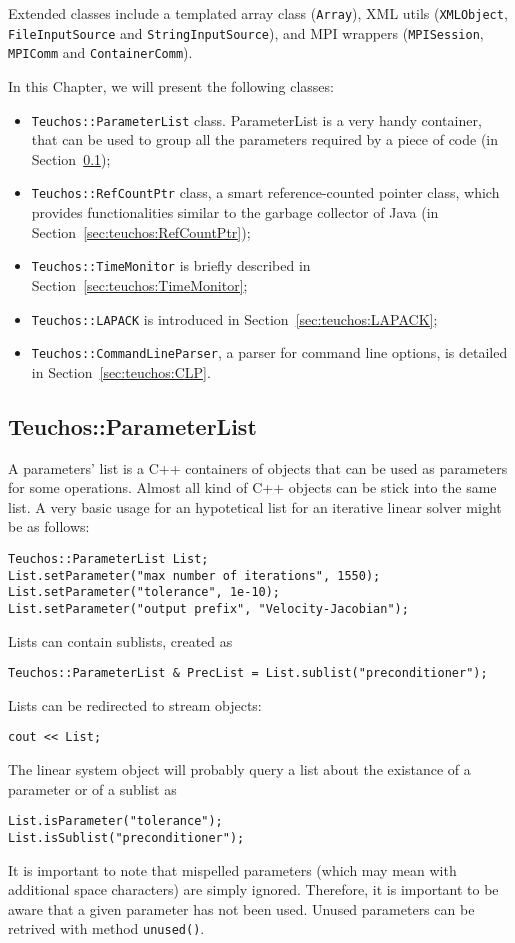 Extended classes include a templated array class
(\verb!Array!), XML utils ({\tt XMLObject},
{\tt FileInputSource} and {\tt StringInputSource}),
and MPI wrappers (\verb!MPISession!, \verb!MPIComm!
and \verb!ContainerComm!).

\medskip

In this Chapter, we will present the following classes:
\begin{itemize}
\item \verb!Teuchos::ParameterList! class. ParameterList is a very handy
  container, that can be used to group all the parameters required by a
  piece of code (in Section~\ref{sec:teuchos:ParameterList});
\item \verb!Teuchos::RefCountPtr! class, a smart reference-counted
  pointer class, which provides functionalities similar to the garbage
  collector of Java (in Section~\ref{sec:teuchos:RefCountPtr});
\item \verb!Teuchos::TimeMonitor! is briefly described in
  Section~\ref{sec:teuchos:TimeMonitor};
\item \verb!Teuchos::LAPACK! is introduced in
  Section~\ref{sec:teuchos:LAPACK};
\item \verb!Teuchos::CommandLineParser!, a parser for command line
  options, is detailed in Section~\ref{sec:teuchos:CLP}.
\end{itemize}


\subsection{Teuchos::ParameterList}
\label{sec:teuchos:ParameterList}

A parameters' list is a C++ containers of objects that can be used as
parameters for some operations. Almost all kind of C++ objects can be
stick into the same list. A very basic usage for an hypotetical list for
an iterative linear solver might be as follows:
\begin{verbatim}
Teuchos::ParameterList List;
List.setParameter("max number of iterations", 1550);
List.setParameter("tolerance", 1e-10);
List.setParameter("output prefix", "Velocity-Jacobian");
\end{verbatim}
Lists can contain sublists, created as 
\begin{verbatim}
Teuchos::ParameterList & PrecList = List.sublist("preconditioner");
\end{verbatim}
Lists can be redirected to stream objects:
\begin{verbatim}
cout << List;
\end{verbatim}
The linear system object will probably query a list about the existance
of a parameter or of a sublist as
\begin{verbatim}
List.isParameter("tolerance");
List.isSublist("preconditioner");
\end{verbatim}
It is important to note that mispelled parameters (which may mean with
additional space characters) are simply ignored. Therefore, it is
important to be aware that a given parameter has not been used. Unused
parameters can be retrived with method \verb!unused()!.

